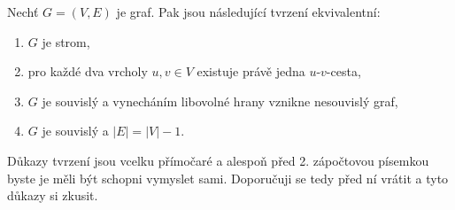 \medskip

\begin{theorem}
Nechť $G = (V, E)$ je graf. Pak jsou následující tvrzení ekvivalentní:
\begin{enumerate}
    \item $G$ je strom,
    \item pro každé dva vrcholy $u, v \in V$ existuje právě jedna $u$-$v$-cesta,
    \item $G$ je souvislý a vynecháním libovolné hrany vznikne nesouvislý graf,
    \item $G$ je souvislý a $|E| = |V| - 1$.
\end{enumerate}
\end{theorem} \bigskip

\begin{remark}
    Důkazy tvrzení jsou vcelku přímočaré a alespoň před 2. zápočtovou písemkou byste je měli být schopni vymyslet sami. Doporučuji se tedy před ní vrátit a tyto důkazy si zkusit.
\end{remark}


